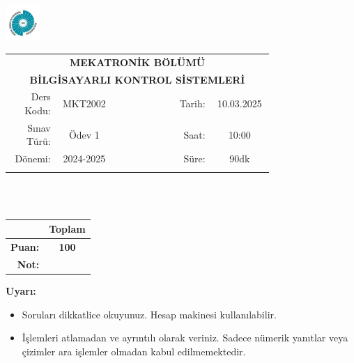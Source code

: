 \newcommand\UniversiteAdi{Niğde Ömer Halisdemir Üniversitesi}
\newcommand\BolumAdi{MEKATRONİK BÖLÜMÜ}
\newcommand\DersKodu{MKT2002}
\newcommand\DersAdi{BİLGİSAYARLI KONTROL SİSTEMLERİ}
\newcommand\SinavAdi{Ödev 1}
\newcommand\SinavTarihi{10.03.2025}
\newcommand\SinavSaati{10:00}
\newcommand\SinavSuresi{90dk}
\pagestyle{fancy}
\fancyhf{} %
\noindent \includegraphics[width=0.1\textwidth]{logo}
\begin{tabular}{
    p{0.15\linewidth}
    p{0.15\linewidth}
    p{0.2\linewidth}
    p{0.1\linewidth}
    p{0.15\linewidth}}
    \multicolumn{5}{c}{\textbf{\BolumAdi}}\\
    \multicolumn{5}{c}{\textbf{\DersAdi}}\\\hline
    \multicolumn{1}{|r|}{Ders Kodu:}&
    \multicolumn{1}{|c|}{\DersKodu}&
    \multicolumn{1}{|c|}{}& 
    \multicolumn{1}{|r|}{Tarih:}&
    \multicolumn{1}{|c|}{\SinavTarihi} \\\hline
    \multicolumn{1}{|r|}{Sınav Türü:}&
    \multicolumn{1}{|c|}{\SinavAdi}&  
    \multicolumn{1}{|c|}{}&
    \multicolumn{1}{|r|}{Saat:}&
    \multicolumn{1}{|c|}{\SinavSaati}\\\hline
    \multicolumn{1}{|r|}{Dönemi:}&
    \multicolumn{1}{|c|}{2024-2025}&
    \multicolumn{1}{|c|}{}&
    \multicolumn{1}{|r|}{Süre:}&
    \multicolumn{1}{|c|}{\SinavSuresi} \\\hline
    &&&&\\
\end{tabular}\\\\
\noindent\begin{center}
\begin{tabular}{|r|c|}\hline
    &\textbf{Toplam}\\\hline
    \textbf{Puan:} &\textbf{100}\\\hline
    \textbf{Not:}  &\\\hline
\end{tabular}\end{center}
\noindent\textbf{Uyarı:}
\begin{itemize}\bfseries
    \item Soruları dikkatlice okuyunuz. Hesap makinesi kullanılabilir.
    \item İşlemleri atlamadan ve ayrıntılı olarak veriniz. Sadece nümerik yanıtlar veya çizimler ara işlemler olmadan kabul edilmemektedir.
\end{itemize}
